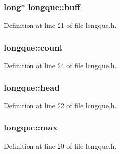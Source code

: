 \subsubsection[{\texorpdfstring{buff}{buff}}]{\setlength{\rightskip}{0pt plus 5cm}long$\ast$ longque\+::buff\hspace{0.3cm}{\ttfamily [protected]}}\hypertarget{classlongque_aa9ecb512dcdc30942ff697db30cad4b9}{}\label{classlongque_aa9ecb512dcdc30942ff697db30cad4b9}


Definition at line 21 of file longque.\+h.

\subsubsection[{\texorpdfstring{count}{count}}]{ longque\+::count\hspace{0.3cm}{\ttfamily [protected]}}\hypertarget{classlongque_a2c61162e0f12c1db5e7e8a9fad0859c9}{}\label{classlongque_a2c61162e0f12c1db5e7e8a9fad0859c9}


Definition at line 24 of file longque.\+h.

\subsubsection[{\texorpdfstring{head}{head}}]{ longque\+::head\hspace{0.3cm}{\ttfamily [protected]}}\hypertarget{classlongque_abbf58acc2166bf48a13bdf4e4149d4ea}{}\label{classlongque_abbf58acc2166bf48a13bdf4e4149d4ea}


Definition at line 22 of file longque.\+h.

\subsubsection[{\texorpdfstring{max}{max}}]{ longque\+::max\hspace{0.3cm}{\ttfamily [protected]}}\hypertarget{classlongque_a1d7037efad55734a7e61b532576d7ccd}{}\label{classlongque_a1d7037efad55734a7e61b532576d7ccd}


Definition at line 20 of file longque.\+h.

